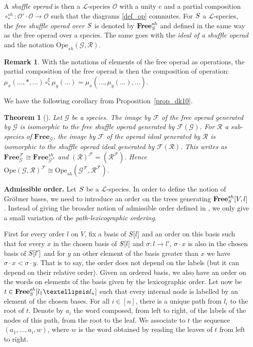 \documentclass[11pt]{article}
\newtheorem{theorem}[theo]{Theorem}
\theoremstyle{definition}
\newtheorem{rema}[theo]{Remark}
\numberwithin{equation}{section}
\newcommand{\spe}[1]{\normalfont{\textsc{#1}}}
\newcommand{\op}[1]{\mathbf{#1}}
\newcommand{\comp}[1][\ast]{\circ_{#1}}
\newcommand{\Operad}{\mathcal{O}}
\newcommand{\free}[1]{\op{Free}_{#1}}
\newcommand{\Ope}{\mathrm{Ope}}
\begin{document}
A {\em shuffle operad} is then a $\mathscr{L}$-species $\Operad$ with a unity $e$ and a partial composition $\comp^{sh}:\Operad'\cdot\Operad\to\Operad$ 
such that the diagrams \eqref{def_op} commutes. 
For $\spe{S}$ a $\mathscr{L}$-species, the {\em free shuffle operad over $\spe{S}$} is denoted by $\free{\spe{S}}^{sh}$ and defined in the same way as the free
operad over a species. The same goes with the {\em ideal of a shuffle operad} and the notation $\Ope_{sh}(\mathcal{G},\mathcal{R})$.

\begin{rema}
    With the notations of elements of the free operad as operations, the partial composition of the free operad is then the composition of operation:
    $\mu_x(\dots, \ast,\dots)\comp^\xi \mu_y(\dots)= \mu_x(\dots,\mu_y(\dots),\dots)$.
\end{rema}

We have the following corollary from Proposition~\ref{prop_dk10}.
\begin{theorem}[{\cite[Corollary 1]{DK10}}]
    Let $\mathcal{G}$ be a species. The image by $\mathscr{F}$ of the free operad generated by $\mathcal{G}$ is isomorphic to the free shuffle operad generated
    by $\mathscr{F}(\mathcal{G})$. For $\mathcal{R}$ a sub-species of $\free{\mathcal{G}}$, the image by $\mathscr{F}$ of the operad ideal generated by $\mathcal{R}$ is 
    isomorphic to the shuffle operad ideal generated  by $\mathscr{F}(\mathcal{R})$.
    This writes as $\free{\mathcal{G}}^{\mathscr{F}} \cong \free{\mathcal{G}^{\mathscr{F}}}^{sh}$ and $(\mathcal{R})^{\mathscr{F}}=(\mathcal{R}^{\mathscr{F}})$. 
    Hence $\Ope(\mathcal{G},\mathcal{R})^{\mathscr{F}}\cong\Ope_{sh}(\mathcal{G}^{\mathscr{F}},\mathcal{R}^{\mathscr{F}})$.
\end{theorem}

\noindent\textbf{Admissible order.} Let $\spe{S}$ be a $\mathscr{L}$-species. In order to define the notion of Gröbner bases, we need to introduce an order on the trees generating $\free{\spe{S}}^{sh}[V,l]$.
Instead of giving the broader notion of admissible order defined in \cite{DK10}, we only give a small variation of the {\em path-lexicographic ordering}.

First for every order $l$ on $V$, fix a basis of $\spe{S}[l]$ and an order on this basis such that for every $x$ in the chosen basis of $\spe{S}[l]$ and $\sigma:l\to l'$,  $\sigma\cdot x$ is also in the chosen basis of $\spe{S}[l']$ and for $y$ an other element of the basis greater than $x$ we have 
$\sigma\cdot x<\sigma\cdot y$.
That is to say, the order does not depend on the labels (but it can depend on their relative order). Given an ordered basis, we also have an order on the words on elements of the basis given by the lexicographic order.
Let now be $t\in\free{\spe{S}}^{sh}[l_1\dots l_n]$ such that every internal node is labelled by an element of the chosen bases. For all $i\in[n]$, there is a unique path from $l_i$ to the root of $t$. Denote by $a_i$ the word composed, from left
to right, of the labels of the nodes of this path, from the root to the leaf. We associate to $t$ the sequence $(a_1,\dots, a_i, w)$, where $w$ is the
word obtained by reading the leaves of $t$ from left to right. 
\end{document}
